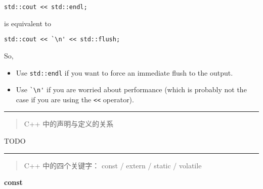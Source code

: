 \verb|std::cout << std::endl;|

is equivalent to

\verb|std::cout << `\n' << std::flush;|

So,
\begin{itemize}
\item Use \verb|std::endl| if you want to force an immediate flush to the output.
\item Use \verb|`\n'| if you are worried about performance (which is probably not the
  case if you are using the \verb|<<| operator).
\end{itemize}


\noindent\rule[0.25\baselineskip]{\textwidth}{1pt}

\begin{quotation}
  {\color{red}C++ 中的声明与定义的关系}
\end{quotation}

TODO


\noindent\rule[0.25\baselineskip]{\textwidth}{1pt}

\begin{quotation}
  {\color{red}C++ 中的四个关键字： const / extern / static / volatile }
\end{quotation}

\noindent\textbf{const}

